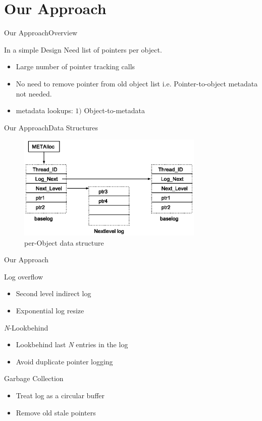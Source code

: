 \documentclass{beamer}
\begin{document}
\section{Our Approach}
\begin{frame}{Our Approach}{Overview}
\begin{block}{In a simple Design}
Need list of pointers per object.
\end{block}
\begin{itemize}
\item Large number of pointer tracking calls 
\item No need to remove pointer from old object list i.e. Pointer-to-object metadata not needed.
\item metadata lookups: $1)$ Object-to-metadata
\end{itemize}
\end{frame}

\begin{frame}{Our Approach}{Data Structures}
\begin{figure}[h]
	\centering
	\includegraphics[width=3.5in]{dangsang_design.eps} 
	\caption{per-Object data structure}
\end{figure}
\end{frame}

\begin{frame}{Our Approach}

\begin{block}{Log overflow}
\begin{itemize}
\item Second level indirect log 
\item Exponential log resize
\end{itemize}
\end{block}

\begin{block}{\emph{N}-Lookbehind}
\begin{itemize}
\item Lookbehind last \emph{N} entries in the log
\item Avoid duplicate pointer logging
\end{itemize}
\end{block}

\begin{block}{Garbage Collection}
\begin{itemize}
\item Treat log as a circular buffer
\item Remove old stale pointers
\end{itemize}
\end{block}
\end{frame}
\end{document}
